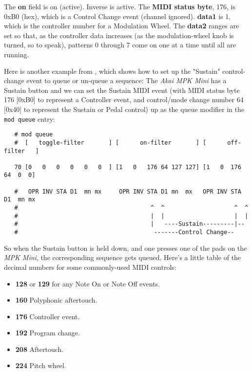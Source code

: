    The \textbf{on} field is on (active).  Inverse is active.  The
   \textbf{MIDI status byte}, 176, is 0xB0 (hex), which is a Control Change
   event (channel ignored).  \textbf{data1} is 1, which is the controller
   number for a Modulation Wheel.  The \textbf{data2} ranges are set so
   that, as the controller data increases (as the modulation-wheel knob is
   turned, so to speak), patterns 0 through 7 come on one at a time until
   all are running.

   Here is another example from \cite{midicontrol}, which shows how to set up
   the "Sustain" control-change event to queue or un-queue a sequence:
   The \textsl{Akai MPK Mini} has a Sustain button and we can set the
   Sustain MIDI event (with MIDI status byte 176 [0xB0] to represent a
   Controller event, and control/mode change number 64 [0x40] to
   represent the Sustain or Pedal control) up as the queue modifier in
   the \texttt{mod queue} entry:

   \begin{verbatim}
   # mod queue
   #  [   toggle-filter       ] [      on-filter       ] [      off-filter   ]

   70 [0   0   0   0   0   0  ] [1   0   176 64 127 127] [1   0  176 64  0  0]

   #   OPR INV STA D1  mn mx     OPR INV STA D1 mn  mx   OPR INV STA D1  mn mx
   #                                      ^  ^                    ^  ^
   #                                      |  |                    |  |
   #                                      |   ----Sustain---------|--
   #                                       -------Control Change--
   \end{verbatim}

   So when the Sustain button is held down, and one presses one of the pads
   on the \textsl{MPK Mini}, the corresponding sequence gets queued.
   Here's a little table of the decimal numbers for some commonly-used MIDI
   controls:

   \begin{itemize}
      \item \textbf{128} or \textbf{129} for any Note On or Note Off events.
      \item \textbf{160} Polyphonic aftertouch.
      \item \textbf{176} Controller event.
      \item \textbf{192} Program change.
      \item \textbf{208} Aftertouch.
      \item \textbf{224} Pitch wheel.
   \end{itemize}

